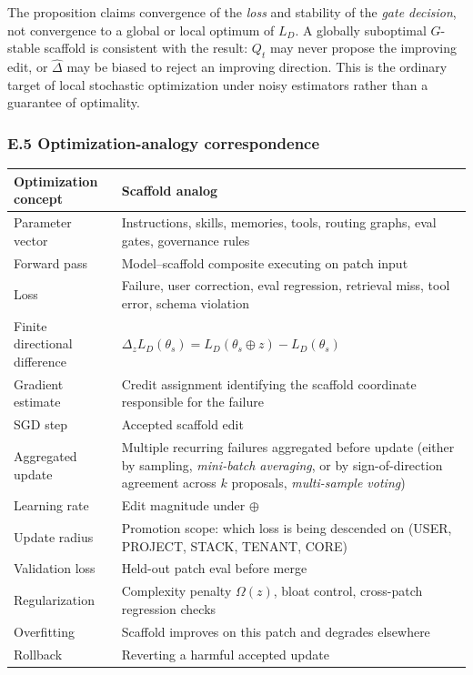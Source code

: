 \documentclass[
]{article}
\newcounter{none} %
\begin{document}
The proposition claims convergence of the \emph{loss} and stability of
the \emph{gate decision}, not convergence to a global or local optimum
of \(L_D\). A globally suboptimal \(G\)-stable scaffold is consistent
with the result: \(Q_t\) may never propose the improving edit, or
\(\widehat{\Delta}\) may be biased to reject an improving direction.
This is the ordinary target of local stochastic optimization under noisy
estimators rather than a guarantee of optimality.

\subsubsection{E.5 Optimization-analogy
correspondence}\label{e.5-optimization-analogy-correspondence}

{\def\LTcaptype{none} %
\begin{longtable}[]{@{}
  >{\raggedright\arraybackslash}p{}
  >{\raggedright\arraybackslash}p{}@{}}
\toprule\noalign{}
\begin{minipage}[b]{\linewidth}\raggedright
Optimization concept
\end{minipage} & \begin{minipage}[b]{\linewidth}\raggedright
Scaffold analog
\end{minipage} \\
\midrule\noalign{}
\endhead
\bottomrule\noalign{}
\endlastfoot
Parameter vector & Instructions, skills, memories, tools, routing
graphs, eval gates, governance rules \\
Forward pass & Model--scaffold composite executing on patch input \\
Loss & Failure, user correction, eval regression, retrieval miss, tool
error, schema violation \\
Finite directional difference &
\(\Delta_z L_D(\theta_s) = L_D(\theta_s \oplus z) - L_D(\theta_s)\) \\
Gradient estimate & Credit assignment identifying the scaffold
coordinate responsible for the failure \\
SGD step & Accepted scaffold edit \\
Aggregated update & Multiple recurring failures aggregated before update
(either by sampling, \emph{mini-batch averaging}, or by
sign-of-direction agreement across \(k\) proposals, \emph{multi-sample
voting}) \\
Learning rate & Edit magnitude under \(\oplus\) \\
Update radius & Promotion scope: which loss is being descended on (USER,
PROJECT, STACK, TENANT, CORE) \\
Validation loss & Held-out patch eval before merge \\
Regularization & Complexity penalty \(\Omega(z)\), bloat control,
cross-patch regression checks \\
Overfitting & Scaffold improves on this patch and degrades elsewhere \\
Rollback & Reverting a harmful accepted update \\
\end{longtable}
}
\end{document}
